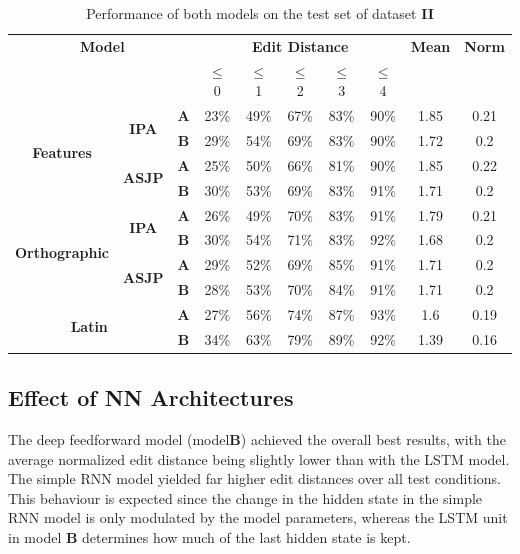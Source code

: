 \begin{table}[!b]
\centering
\begin{tabular}{c|c|c|ccccc|cc}
    \hline
    \multicolumn{3}{c|}{\textbf{Model}} & \multicolumn{5}{c|}{\textbf{Edit Distance}} & \textbf{Mean} & \textbf{Norm} \\
    \multicolumn{3}{c|}{} & \textbf{$\leq$} 0 & \textbf{$\leq$} 1 & \textbf{$\leq$} 2 & \textbf{$\leq$} 3 & \textbf{$\leq$} 4 & \\
    \hline
    
    \multirow{4}{*}{\textbf{Features}} 
        & \multirow{2}{*}{\textbf{IPA}} 
            &  \textbf{A} & 23\% & 49\% & 67\% & 83\% & 90\% & 1.85 & 0.21 \\
            && \textbf{B} & 29\% & 54\% & 69\% & 83\% & 90\% & 1.72 & 0.2  \\
        \cline{2-10}
        & \multirow{2}{*}{\textbf{ASJP}}
            &  \textbf{A} & 25\% & 50\% & 66\% & 81\% & 90\% & 1.85 & 0.22 \\
            && \textbf{B} & 30\% & 53\% & 69\% & 83\% & 91\% & 1.71 & 0.2  \\
    \hline
    
    \multirow{4}{*}{\textbf{Orthographic}} 
        & \multirow{2}{*}{\textbf{IPA}} 
            &  \textbf{A} & 26\% & 49\% & 70\% & 83\% & 91\% & 1.79 & 0.21 \\
            && \textbf{B} & 30\% & 54\% & 71\% & 83\% & 92\% & 1.68 & 0.2 \\
        \cline{2-10}
        & \multirow{2}{*}{\textbf{ASJP}}
            &  \textbf{A} & 29\% & 52\% & 69\% & 85\% & 91\% & 1.71 & 0.2  \\
            && \textbf{B} & 28\% & 53\% & 70\% & 84\% & 91\% & 1.71 & 0.2  \\
    \hline
    
    \multicolumn{2}{c|}{\multirow{2}{*}{\textbf{Latin}}}
        &  \textbf{A} & 27\% & 56\% & 74\% & 87\% & 93\% & 1.6 & 0.19 \\
        && \textbf{B} & 34\% & 63\% & 79\% & 89\% & 92\% & 1.39 & 0.16 \\
    \hline
    
\end{tabular}
\caption{Performance of both models on the test set of dataset \textbf{II}}
\label{tab:results_ciobanu}
\end{table}

\subsection{Effect of NN Architectures}
The deep feedforward model (model\textbf{B}) achieved the overall best results, with the average normalized edit distance being slightly lower than with the LSTM model. The simple RNN model yielded far higher edit distances over all test conditions. This behaviour is expected since the change in the hidden state in the simple RNN model is only modulated by the model parameters, whereas the LSTM unit in model \textbf{B} determines how much of the last hidden state is kept.

